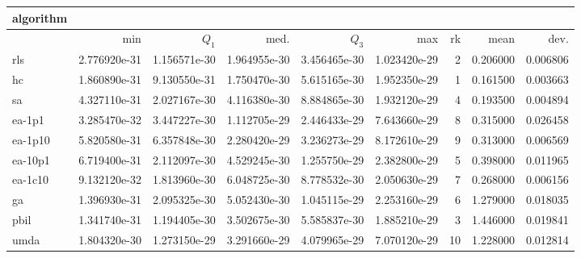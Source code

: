 \begin{tabular}{@{}l*{5}{>{{}}N{1}{1}}>{{}}N{2}{0}N{1}{3}N{1}{3}@{}}
\toprule
{algorithm} &  &  \\
\midrule
& {min} & {$Q_1$} & {med.} & {$Q_3$} & {max} & {rk} & {mean} & {dev.} \\
\midrule
rls & 2.776920e-31 & 1.156571e-30 & 1.964955e-30 & {\color{blue}} 3.456465e-30 & {\color{blue}} 1.023420e-29 & 2 & 0.206000 & 0.006806 \\
 hc & 1.860890e-31 & {\color{blue}} 9.130550e-31 & {\color{blue}} 1.750470e-30 & 5.615165e-30 & 1.952350e-29 & 1 & 0.161500 & 0.003663 \\
 sa & 4.327110e-31 & 2.027167e-30 & 4.116380e-30 & 8.884865e-30 & 1.932120e-29 & 4 & 0.193500 & 0.004894 \\
 ea-1p1 & {\color{blue}} 3.285470e-32 & 3.447227e-30 & 1.112705e-29 & 2.446433e-29 & 7.643660e-29 & 8 & 0.315000 & 0.026458 \\
 ea-1p10 & 5.820580e-31 & 6.357848e-30 & 2.280420e-29 & 3.236273e-29 & 8.172610e-29 & 9 & 0.313000 & 0.006569 \\
 ea-10p1 & 6.719400e-31 & 2.112097e-30 & 4.529245e-30 & 1.255750e-29 & 2.382800e-29 & 5 & 0.398000 & 0.011965 \\
 ea-1c10 & 9.132120e-32 & 1.813960e-30 & 6.048725e-30 & 8.778532e-30 & 2.050630e-29 & 7 & 0.268000 & 0.006156 \\
 ga & 1.396930e-31 & 2.095325e-30 & 5.052430e-30 & 1.045115e-29 & 2.253160e-29 & 6 & 1.279000 & 0.018035 \\
 pbil & 1.341740e-31 & 1.194405e-30 & 3.502675e-30 & 5.585837e-30 & 1.885210e-29 & 3 & 1.446000 & 0.019841 \\
 umda & 1.804320e-30 & 1.273150e-29 & 3.291660e-29 & 4.079965e-29 & 7.070120e-29 & 10 & 1.228000 & 0.012814 \\
 \bottomrule
\end{tabular}

